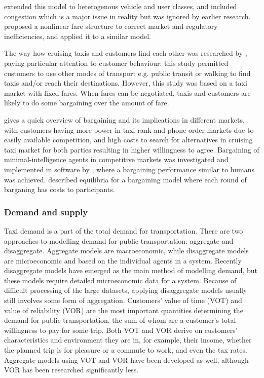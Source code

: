 \textcite{Wong2008taxi+modeling} extended this model to heterogenous vehicle
and user classes, and included congestion which is a major issue in reality but
was ignored by earlier research. \textcite{Yang2010taxi+nonlinear} proposed a
nonlinear fare structure to correct market and regulatory inefficiencies, and
applied it to a similar model.

The way how cruising taxis and customers find each other was researched by
\textcite{Yang2010taxi+equilibria}, paying particular attention to customer
behaviour: this study permitted customers to use other modes of transport e.g.
public transit or walking to find taxis and/or reach their destinations.
However, this study was based on a taxi market with fixed fares. When fares can
be negotiated, taxis and customers are likely to do some bargaining over the
amount of fare.

\textcite{Cairns1996taxi+competition} gives a quick overview of bargaining and
its implications in different markets, with customers having more power in taxi
rank and phone order markets due to easily available competition, and high
costs to search for alternatives in cruising taxi market for both parties
resulting in higher willingness to agree. Bargaining of minimal-intelligence
agents in competitive markets was investigated and implemented in software by
\textcite{Cli1997taxi+bargaining}, where a bargaining performance similar to
humans was achieved. \textcite{Rubinstein1982taxi+bargaining} described
equilibria for a bargaining model where each round of barganing has costs to
participants.


\subsubsection{Demand and supply}
\label{sec:literature:taxis:demand}

Taxi demand is a part of the total demand for transportation. There are two
approaches to modelling demand for public transportation: aggregate and
disaggregate. Aggregate models are macroeconomic, while disaggregate models are
microeconomic and based on the individual agents in a system. Recently
disaggregate models have emerged as the main method of modelling demand, but
these models require detailed microeconomic data for a system. Because of
difficult processing of the large datasets, applying disaggregate models
usually still involves some form of aggregation. Customers' value of time (VOT)
and value of reliability (VOR) are the most important quantities determining
the demand for public transportation, the sum of whom are a customer's total
willingness to pay for some trip. Both VOT and VOR derive on customers'
characteristics and environment they are in, for example, their income, whether
the planned trip is for pleasure or a commute to work, and even the tax rates.
Aggregate models using VOT and VOR have been developed as well, although VOR
has been researched significantly less. \parencite{Small2007taxi+urban}

